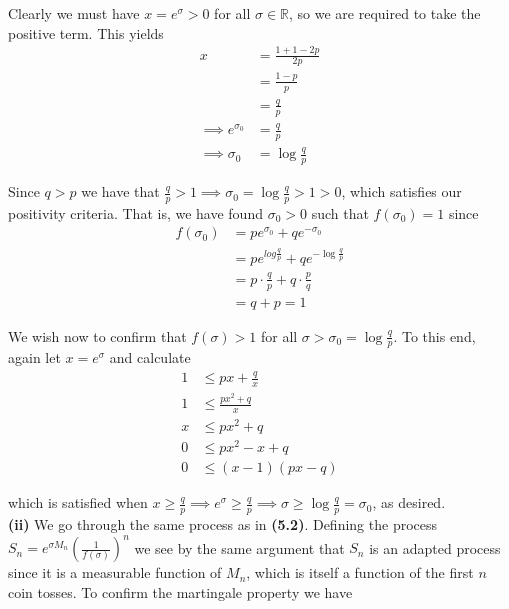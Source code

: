 \documentclass[12pt]{article}
\newlength\tindent
\renewcommand{\indent}{\hspace*{\tindent}}
\newcommand{\R}{\mathbb R}
\begin{document}
\indent Clearly we must have $x = e^\sigma > 0$ for all $\sigma \in \R$, so we are required to take the positive term. This yields
\begin{align*}
	x &= \frac{ 1 + 1 - 2p }{ 2p } \\
	&= \frac{1 - p}{ p } \\
	&= \frac{q}{p} \\
	\implies e^{\sigma_0} &= \frac{q}{p} \\
	\implies \sigma_0 &= \log \frac{q}{p}
\end{align*}

\indent Since $q > p$ we have that $\frac{q}{p} > 1 \implies \sigma_0 = \log \frac{q}{p} > 1 > 0$, which satisfies our positivity criteria. That is, we have found $\sigma_0 > 0$ such that $f(\sigma_0) = 1$ since
\begin{align*}
	f(\sigma_0) &= pe^{\sigma_0} + qe^{-\sigma_0} \\
	&= pe^{log \frac{q}{p} } + qe^{-\log \frac{q}{p} } \\
	&= p \cdot \frac{q}{p} + q \cdot \frac{p}{q} \\ 
	&= q + p = 1
\end{align*}

\indent We wish now to confirm that $f(\sigma) > 1$ for all $\sigma > \sigma_0 = \log \frac{q}{p}$. To this end, again let $x = e^\sigma$ and calculate
\begin{align*}
	1 &\leq px + \frac{q}{x} \\
	1 &\leq \frac{px^2 + q}{x} \\
	x &\leq px^2 + q \\
	0 &\leq px^2 - x + q \\
	0 &\leq (x - 1)(px - q)
\end{align*}

which is satisfied when $x \geq \frac{q}{p} \implies e^\sigma \geq \frac{q}{p} \implies \sigma \geq \log \frac{q}{p} = \sigma_0$, as desired.\\

{\bf (ii)} We go through the same process as in {\bf (5.2)}. Defining the process $S_{n} = e^{\sigma M_n} \left( \frac{1}{ f(\sigma) } \right)^n$ we see by the same argument that $S_n$ is an adapted process since it is a measurable function of $M_n$, which is itself a function of the first $n$ coin tosses. To confirm the martingale property we have
\end{document}
